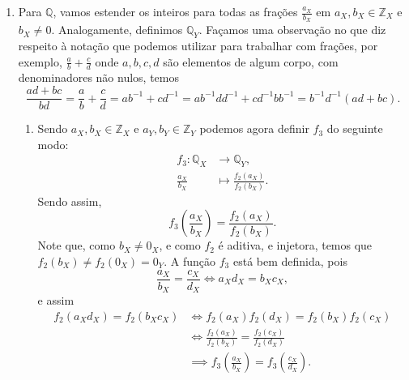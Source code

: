 \documentclass[../main.tex]{subfiles}
\begin{document}
\begin{dem}
\begin{enumerate}
    \item Para $\mathbb{Q}$, vamos estender os inteiros para todas as frações $\frac{a_X}{b_X}$ em $a_X, b_X \in \mathbb{Z}_X$ e $b_X \neq 0$. Analogamente, definimos $\mathbb{Q}_Y$. 
        Façamos uma observação no que diz respeito à notação que podemos utilizar para trabalhar com frações, por exemplo, $\frac{a}{b} + \frac{c}{d}$ onde $a,b,c,d$ são elementos de algum corpo, com denominadores não nulos, temos 
        \[ \frac{ad+bc}{bd} = \frac{a}{b} + \frac{c}{d} = ab^{-1} + cd^{-1} = ab^{-1}dd^{-1} + cd^{-1}bb^{-1} = b^{-1}d^{-1}(ad+bc). \]
        \begin{enumerate}
            \item  Sendo $a_X, b_X \in \mathbb{Z}_X$ e $a_Y, b_Y \in \mathbb{Z}_Y$ podemos agora definir $f_3$ do seguinte modo:
                \begin{align*}
                    f_3 \colon \mathbb{Q}_X &\to \mathbb{Q}_Y, \\
                    \frac{a_X}{b_X} &\mapsto \frac{f_2(a_X)}{f_2(b_X)}.
                \end{align*}
                Sendo assim, 
                \[ f_3\left(\frac{a_X}{b_X}\right) = \frac{f_2(a_X)}{f_2(b_X)}. \]
                Note que, como $b_X \neq 0_X$, e como $f_2$ é aditiva, e injetora, temos que \\
                $f_2(b_X) \neq f_2(0_X)=0_Y$. 
                A função $f_3$ está bem definida, pois
                \[ \frac{a_X}{b_X} = \frac{c_X}{d_X} \iff a_Xd_X = b_Xc_X, \] 
                e assim 
                \begin{align*}
                    f_2(a_Xd_X) = f_2(b_Xc_X) &\iff f_2(a_X)f_2(d_X) = f_2(b_X)f_2(c_X) \\
                    &\iff \frac{f_2(a_X)}{f_2(b_X)} = \frac{f_2(c_X)}{f_2(d_X)} \\
                    &\implies f_3\left(\frac{a_X}{b_X}\right) = f_3\left(\frac{c_X}{d_X}\right).
                \end{align*}


\end{enumerate}
\end{enumerate}
\end{dem}
\end{document}
